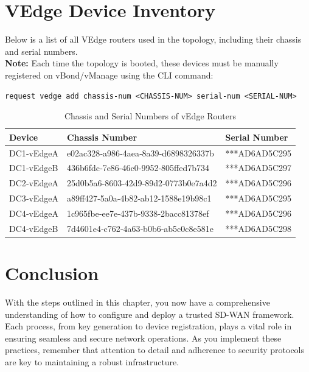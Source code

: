 \documentclass[12pt,english]{report}
\begin{document}
\section{VEdge Device Inventory}

Below is a list of all VEdge routers used in the topology, including their chassis and serial numbers. \\
\textbf{Note:} Each time the topology is booted, these devices must be manually registered on vBond/vManage using the CLI command:
\begin{lstlisting}[style=BashStyle]
request vedge add chassis-num <CHASSIS-NUM> serial-num <SERIAL-NUM>
\end{lstlisting}
\begin{table}[h!]
    \centering
    \caption{Chassis and Serial Numbers of vEdge Routers}
    \label{tab:vedge_chassis_serials}
    \begin{tabularx}{\linewidth}{@{}>{\raggedright\arraybackslash}p{3cm}>{\raggedright\arraybackslash}p{7.5cm}>{\raggedright\arraybackslash}X@{}}
        \toprule
        \textbf{Device} & \textbf{Chassis Number} & \textbf{Serial Number} \\
        \midrule
        DC1‑vEdgeA & e02ac328‑a986‑4aea‑8a39‑d6898326337b & ***AD6AD5C295 \\
        DC1‑vEdgeB & 436b6fdc‑7e86‑46c0‑9952‑805ffed7b734 & ***AD6AD5C297 \\
        DC2‑vEdgeA & 25d0b5a6‑8603‑42d9‑89d2‑0773b0e7a4d2 & ***AD6AD5C296 \\
        DC3‑vEdgeA & a89ff427‑5a0a‑4b82‑ab12‑1588e19b98c1 & ***AD6AD5C295 \\
        DC4‑vEdgeA & 1c965fbe‑ee7e‑437b‑9338‑2bacc81378ef & ***AD6AD5C296 \\
        DC4‑vEdgeB & 7d4601e4‑c762‑4a63‑b0b6‑ab5c0c8e581e & ***AD6AD5C298 \\
        \bottomrule
    \end{tabularx}
\end{table}
\section{Conclusion}
With the steps outlined in this chapter, you now have a comprehensive understanding of how to configure and deploy a trusted SD-WAN framework. Each process, from key generation to device registration, plays a vital role in ensuring seamless and secure network operations. As you implement these practices, remember that attention to detail and adherence to security protocols are key to maintaining a robust infrastructure.
\end{document}
